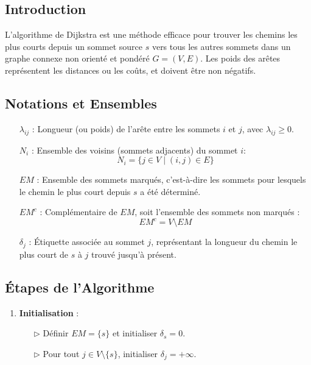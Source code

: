 \documentclass{report}
\begin{document}
\begin{multicols*}{2}
\subsection{Introduction}

L'algorithme de Dijkstra est une méthode efficace pour trouver les chemins les plus courts depuis un sommet source \( s \) vers tous les autres sommets dans un graphe connexe non orienté et pondéré \( G = (V, E) \). Les poids des arêtes représentent les distances ou les coûts, et doivent être non négatifs.

\subsection{Notations et Ensembles}

\begin{itemize}
    \item[\( \lambda_{ij} \)] : Longueur (ou poids) de l'arête entre les sommets \( i \) et \( j \), avec \( \lambda_{ij} \geq 0 \).
    \item[\( N_i \)] : Ensemble des voisins (sommets adjacents) du sommet \( i \):
        \[
            N_i = \{ j \in V \mid (i, j) \in E \}
        \]
    \item[\( EM \)] : Ensemble des sommets marqués, c'est-à-dire les sommets pour lesquels le chemin le plus court depuis \( s \) a été déterminé.
    \item[\( EM^c \)] : Complémentaire de \( EM \), soit l'ensemble des sommets non marqués :
        \[
            EM^c = V \setminus EM
        \]
    \item[\( \delta_j \)] : Étiquette associée au sommet \( j \), représentant la longueur du chemin le plus court de \( s \) à \( j \) trouvé jusqu'à présent.
\end{itemize}

\subsection{Étapes de l'Algorithme}

\begin{enumerate}
    \item \textbf{Initialisation} :
        \begin{itemize}
            \item[\( \rhd \)] Définir \( EM = \{ s \} \) et initialiser \( \delta_s = 0 \).
            \item[\( \rhd \)] Pour tout \( j \in V \setminus \{ s \} \), initialiser \( \delta_j = +\infty \).
        \end{itemize}


\end{enumerate}
\end{multicols*}
\end{document}
